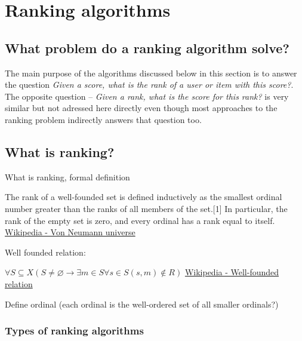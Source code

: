 \chapter{\label{ranking-algorithms}Ranking algorithms}

\section{What problem do a ranking algorithm solve?}


The main purpose of the algorithms discussed below in this section is to answer the question \emph{Given a score, what is the rank of a user or item with this score?}. The opposite question -- \emph{Given a rank, what is the score for this rank?} is very similar but not adressed here directly even though most approaches to the ranking problem indirectly answers that question too.


\section{What is ranking?}

\begin{shaded}
  
  What is ranking, formal definition
 
The rank of a well-founded set is defined inductively as the smallest ordinal number greater than the ranks of all members of the set.[1] In particular, the rank of the empty set is zero, and every ordinal has a rank equal to itself.
\href{https://en.wikipedia.org/wiki/Von\_Neumann\_universe}{Wikipedia - Von Neumann universe}

Well founded relation:

$\forall S \subseteq X ( S \neq \varnothing \rightarrow \exists m \in S \forall s \in S (s, m) \notin R)$ \href{https://en.wikipedia.org/wiki/Well-founded\_relation}{Wikipedia - Well-founded relation}

Define ordinal (each ordinal is the well-ordered set of all smaller ordinals?)

\end{shaded}

\subsection{Types of ranking algorithms}

